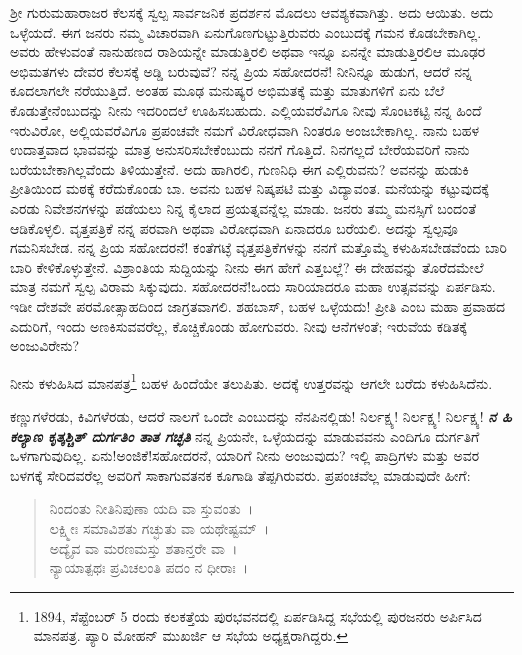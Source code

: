 ಶ‍್ರೀ ಗುರುಮಹಾರಾಜರ ಕೆಲಸಕ್ಕೆ ಸ್ವಲ್ಪ ಸಾರ್ವಜನಿಕ ಪ್ರದರ್ಶನ ಮೊದಲು ಆವಶ್ಯಕವಾಗಿತ್ತು. ಅದು ಆಯಿತು. ಅದು ಒಳ್ಳೆಯದೆ. ಈಗ ಜನರು ನಮ್ಮ ವಿಚಾರವಾಗಿ ಏನುಗೊಣಗುಟ್ಟುತ್ತಿರುವರು ಎಂಬುದಕ್ಕೆ ಗಮನ ಕೊಡಬೇಕಾಗಿಲ್ಲ. ಅವರು ಹೇಳುವಂತೆ ನಾನುಹಣದ ರಾಶಿಯನ್ನೇ ಮಾಡುತ್ತಿರಲಿ ಅಥವಾ ಇನ್ನೂ ಏನನ್ನೇ ಮಾಡುತ್ತಿರಲಿ\enginline{-}ಆ ಮೂಢರ ಅಭಿಮತಗಳು ದೇವರ ಕೆಲಸಕ್ಕೆ ಅಡ್ಡಿ ಬರುವುವೆ? ನನ್ನ ಪ್ರಿಯ ಸಹೋದರನೆ! ನೀನಿನ್ನೂ ಹುಡುಗ, ಆದರೆ ನನ್ನ ಕೂದಲಾಗಲೇ ನರೆಯುತ್ತಿದೆ. ಅಂತಹ ಮೂಢ ಮನುಷ್ಯರ ಅಭಿಮತಕ್ಕೆ ಮತ್ತು ಮಾತುಗಳಿಗೆ ಏನು ಬೆಲೆ ಕೊಡುತ್ತೇನೆಂಬುದನ್ನು ನೀನು ಇದರಿಂದಲೆ ಊಹಿಸಬಹುದು. ಎಲ್ಲಿಯವರೆವಿಗೂ ನೀವು ಸೊಂಟಕಟ್ಟಿ ನನ್ನ ಹಿಂದೆ ಇರುವಿರೋ, ಅಲ್ಲಿಯವರೆವಿಗೂ ಪ್ರಪಂಚವೇ ನಮಗೆ ವಿರೋಧವಾಗಿ ನಿಂತರೂ ಅಂಜಬೇಕಾಗಿಲ್ಲ. ನಾನು ಬಹಳ ಉದಾತ್ತವಾದ ಭಾವವನ್ನು ಮಾತ್ರ ಅನುಸರಿಸಬೇಕೆಂಬುದು ನನಗೆ ಗೊತ್ತಿದೆ. ನಿನಗಲ್ಲದೆ ಬೇರೆಯವರಿಗೆ ನಾನು ಬರೆಯಬೇಕಾಗಿಲ್ಲವೆಂದು ತಿಳಿಯುತ್ತೇನೆ. ಅದು ಹಾಗಿರಲಿ, ಗುಣನಿಧಿ ಈಗ ಎಲ್ಲಿರುವನು? ಅವನನ್ನು ಹುಡುಕಿ ಪ್ರೀತಿಯಿಂದ ಮಠಕ್ಕೆ ಕರೆದುಕೊಂಡು ಬಾ. ಅವನು ಬಹಳ ನಿಷ್ಕಪಟಿ ಮತ್ತು ವಿದ್ಯಾವಂತ. ಮನೆಯನ್ನು ಕಟ್ಟುವುದಕ್ಕೆ ಎರಡು ನಿವೇಶನಗಳನ್ನು ಪಡೆಯಲು ನಿನ್ನ ಕೈಲಾದ ಪ್ರಯತ್ನವನ್ನೆಲ್ಲ ಮಾಡು. ಜನರು ತಮ್ಮ ಮನಸ್ಸಿಗೆ ಬಂದಂತೆ ಆಡಿಕೊಳ್ಳಲಿ. ವೃತ್ತಪತ್ರಿಕೆ ನನ್ನ ಪರವಾಗಿ ಅಥವಾ ವಿರೋಧವಾಗಿ ಏನಾದರೂ ಬರೆಯಲಿ. ಅದನ್ನು ಸ್ವಲ್ಪವೂ ಗಮನಿಸಬೇಡ. ನನ್ನ ಪ್ರಿಯ ಸಹೋದರನೆ! ಕಂತೆಗಟ್ಳೆ ವೃತ್ತಪತ್ರಿಕೆಗಳನ್ನು ನನಗೆ ಮತ್ತೊಮ್ಮೆ ಕಳುಹಿಸಬೇಡವೆಂದು ಬಾರಿ ಬಾರಿ ಕೇಳಿಕೊಳ್ಳುತ್ತೇನೆ. ವಿಶ್ರಾಂತಿಯ ಸುದ್ದಿಯನ್ನು ನೀನು ಈಗ ಹೇಗೆ ಎತ್ತಬಲ್ಲೆ? ಈ ದೇಹವನ್ನು ತೊರೆದಮೇಲೆ ಮಾತ್ರ ನಮಗೆ ಸ್ವಲ್ಪ ವಿರಾಮ ಸಿಕ್ಕುವುದು. ಸಹೋದರನೆ!ಒಂದು ಸಾರಿಯಾದರೂ ಮಹಾ ಉತ್ಸವವನ್ನು ಏರ್ಪಡಿಸು. ಇಡೀ ದೇಶವೇ ಪರಮೋತ್ಸಾಹದಿಂದ ಜಾಗ್ರತವಾಗಲಿ. ಶಹಬಾಸ್, ಬಹಳ ಒಳ್ಳೆಯದು! ಪ್ರೀತಿ ಎಂಬ ಮಹಾ ಪ್ರವಾಹದ ಎದುರಿಗೆ, ಇಂದು ಅಣಕಿಸುವವರೆಲ್ಲ, ಕೊಚ್ಚಿಕೊಂಡು ಹೋಗುವರು. ನೀವು ಆನೆಗಳಂತೆ; ಇರುವೆಯ ಕಡಿತಕ್ಕೆ ಅಂಜುವಿರೇನು?

ನೀನು ಕಳುಹಿಸಿದ ಮಾನಪತ್ರ\footnote{1894, ಸೆಪ್ಟೆಂಬರ್ 5 ರಂದು ಕಲಕತ್ತೆಯ ಪುರಭವನದಲ್ಲಿ ಏರ್ಪಡಿಸಿದ್ದ ಸಭೆಯಲ್ಲಿ ಪುರಜನರು ಅರ್ಪಿಸಿದ ಮಾನಪತ್ರ. ಪ್ಯಾರಿ ಮೋಹನ್ ಮುಖರ್ಜಿ ಆ ಸಭೆಯ ಅಧ್ಯಕ್ಷರಾಗಿದ್ದರು.} ಬಹಳ ಹಿಂದೆಯೇ ತಲುಪಿತು. ಅದಕ್ಕೆ ಉತ್ತರವನ್ನು ಆಗಲೇ ಬರೆದು ಕಳುಹಿಸಿದೆನು.

ಕಣ್ಣುಗಳೆರಡು, ಕಿವಿಗಳೆರಡು, ಆದರೆ ನಾಲಗೆ ಒಂದೇ ಎಂಬುದನ್ನು ನೆನಪಿನಲ್ಲಿಡು! ನಿರ್ಲಕ್ಷ್ಯ! ನಿರ್ಲಕ್ಷ್ಯ! ನಿರ್ಲಕ್ಷ್ಯ! \textbf{\textit{ನ ಹಿ ಕಲ್ಯಾಣ ಕೃತ್ಕಶ್ಚಿತ್ ದುರ್ಗತಿಂ ತಾತ ಗಚ್ಛತಿ}} ನನ್ನ ಪ್ರಿಯನೇ, ಒಳ್ಳೆಯದನ್ನು ಮಾಡುವವನು ಎಂದಿಗೂ ದುರ್ಗತಿಗೆ ಒಳಗಾಗುವುದಿಲ್ಲ. ಏನು!ಅಂಜಿಕೆ!ಸಹೋದರನೆ, ಯಾರಿಗೆ ನೀನು ಅಂಜುವುದು? ಇಲ್ಲಿ ಪಾದ್ರಿಗಳು ಮತ್ತು ಅವರ ಬಳಗಕ್ಕೆ ಸೇರಿದವರೆಲ್ಲ ಅವರಿಗೆ ಸಾಕಾಗುವತನಕ ಕೂಗಾಡಿ ತೆಪ್ಪಗಿರುವರು. ಪ್ರಪಂಚವೆಲ್ಲ ಮಾಡುವುದೇ ಹೀಗೆ:
\begin{verse}
 ನಿಂದಂತು ನೀತಿನಿಪುಣಾ ಯದಿ ವಾ ಸ್ತುವಂತು~।\\
 ಲಕ್ಷ್ಮೀಃ ಸಮಾವಿಶತು ಗಚ್ಛುತು ವಾ ಯಥೇಷ್ಟಮ್~।\\
 ಅದ್ಯೈವ ವಾ ಮರಣಮಸ್ತು ಶತಾನ್ತರೇ ವಾ~।\\
 ನ್ಯಾಯಾತ್ಪಥಃ ಪ್ರವಿಚಲಂತಿ ಪದಂ ನ ಧೀರಾಃ~।  
\end{verse}

